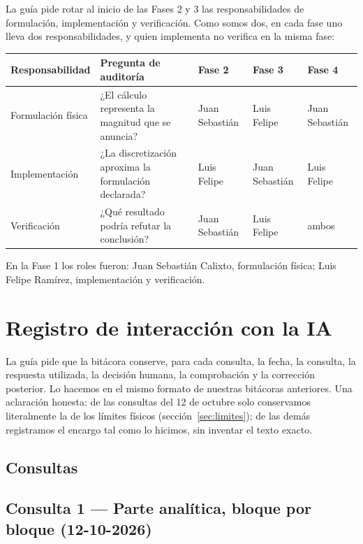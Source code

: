 \documentclass[11pt]{article}
\begin{document}
La guía pide rotar al inicio de las Fases 2 y 3 las responsabilidades de formulación, implementación y verificación. Como somos dos, en cada fase uno lleva dos responsabilidades, y quien implementa no verifica en la misma fase:

\begin{table}[H]
\centering
\small
\begin{tabular}{@{}L{4.5cm}L{3.8cm}lll@{}}
\toprule
\textbf{Responsabilidad} & \textbf{Pregunta de auditoría} & \textbf{Fase 2} & \textbf{Fase 3} & \textbf{Fase 4}\\
\midrule
Formulación física & ¿El cálculo representa la magnitud que se anuncia? & Juan Sebastián & Luis Felipe & Juan Sebastián\\
Implementación & ¿La discretización aproxima la formulación declarada? & Luis Felipe & Juan Sebastián & Luis Felipe\\
Verificación & ¿Qué resultado podría refutar la conclusión? & Juan Sebastián & Luis Felipe & ambos\\
\bottomrule
\end{tabular}
\end{table}

En la Fase 1 los roles fueron: Juan Sebastián Calixto, formulación física; Luis Felipe Ramírez, implementación y verificación.

\section{Registro de interacción con la IA}
\label{sec:ia}

La guía pide que la bitácora conserve, para cada consulta, la fecha, la consulta, la respuesta utilizada, la decisión humana, la comprobación y la corrección posterior. Lo hacemos en el mismo formato de nuestras bitácoras anteriores. Una aclaración honesta: de las consultas del 12 de octubre solo conservamos literalmente la de los límites físicos (sección~\ref{sec:limites}); de las demás registramos el encargo tal como lo hicimos, sin inventar el texto exacto.

\subsection{Consultas}

\subsection*{Consulta 1 --- Parte analítica, bloque por bloque (12-10-2026)}
\end{document}
